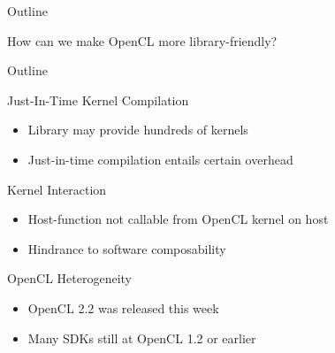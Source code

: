 


\begin{frame}{Outline}
\begin{center}
 {\Large How can we make OpenCL more library-friendly?}
\end{center}
\end{frame}


\begin{frame}{Outline}

 \begin{block}{Just-In-Time Kernel Compilation}
   \begin{itemize}
    \item Library may provide hundreds of kernels
    \item Just-in-time compilation entails certain overhead
   \end{itemize}
 \end{block}

 \begin{block}{Kernel Interaction}
   \begin{itemize}
    \item Host-function not callable from OpenCL kernel on host
    \item Hindrance to software composability
   \end{itemize}
 \end{block}

  \begin{block}{OpenCL Heterogeneity}
   \begin{itemize}
    \item OpenCL 2.2 was released this week
    \item Many SDKs still at OpenCL 1.2 or earlier
   \end{itemize}
 \end{block}
\end{frame}



